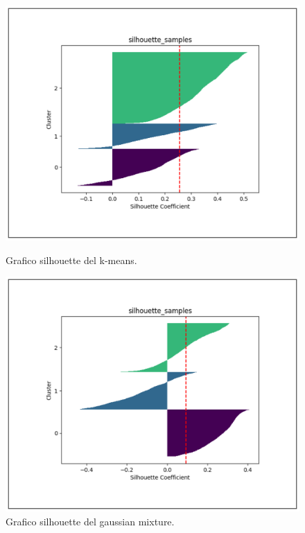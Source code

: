 \begin{figure}[t]
    \begin{multicols}{3}
        \centering
        \includegraphics[width=\linewidth]{img//6/6.png}
        \caption{Grafico silhouette del k-means.}
        \label{fig:6-6}
        
        \columnbreak
        
        \includegraphics[width=\linewidth]{img//6/7.png}
        \caption{Grafico silhouette del gaussian mixture.}
        \label{fig:6-7}

        \columnbreak
        

\end{multicols}
\end{figure}
